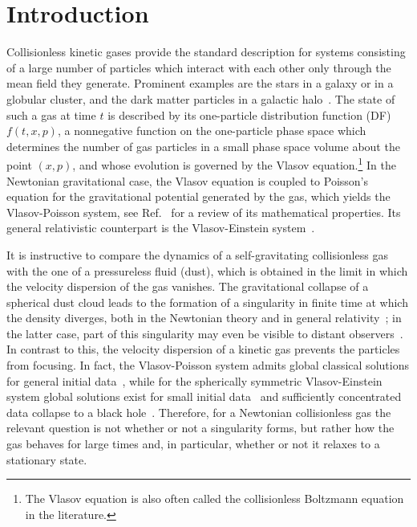 \section{Introduction}
\label{Sec:Introduction}

Collisionless kinetic gases provide the standard description for systems consisting of a large number of particles which interact with each other only through the mean field they generate. Prominent examples are the stars in a galaxy or in a globular cluster, and the dark matter particles in a galactic halo~\cite{BinneyTremaine-Book}. The state of such a gas at time $t$ is described by its one-particle distribution function (DF) $f(t,x,p)$, a nonnegative function on the one-particle phase space which determines the number of gas particles in a small phase space volume about the point $(x,p)$, and whose evolution is governed by the Vlasov equation.\footnote{The Vlasov equation is also often called the collisionless Boltzmann equation in the literature.} In the Newtonian gravitational case, the Vlasov equation is coupled to Poisson's equation for the gravitational potential generated by the gas, which yields the Vlasov-Poisson system, see Ref.~\cite{gR07} for a review of its mathematical properties. Its general relativistic counterpart is the Vlasov-Einstein system~\cite{hA11}.

It is instructive to compare the dynamics of a self-gravitating collisionless gas with the one of a pressureless fluid (dust), which is obtained in the limit in which the velocity dispersion of the gas vanishes. The gravitational collapse of a spherical dust cloud leads to the formation of a singularity in finite time at which the density diverges, both in the Newtonian theory and in general relativity~\cite{jOhS39}; in the latter case, part of this singularity may even be visible to distant observers~\cite{dC84,nOoS11}. In contrast to this, the velocity dispersion of a kinetic gas prevents the particles from focusing. In fact, the Vlasov-Poisson system admits global classical solutions for general initial data~\cite{kP92,pLbP91,jS91}, while for the spherically symmetric Vlasov-Einstein system global solutions exist for small initial data~\cite{gRaR92} and sufficiently concentrated data collapse to a black hole~\cite{hAmKgR11}. Therefore, for a Newtonian collisionless gas the relevant question is not whether or not a singularity forms, but rather how the gas behaves for large times and, in particular, whether or not it relaxes to a stationary state.

